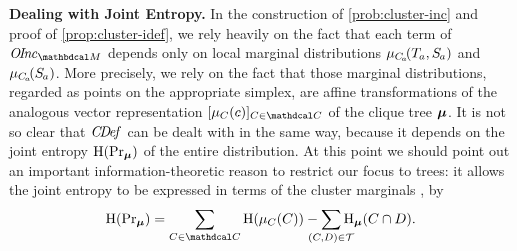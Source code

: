 \documentclass[twoside]{article}
\begin{document}
\textbf{Dealing with Joint Entropy.}
%
In the construction of \eqref{prob:cluster-inc}
and proof of \cref{prop:cluster-idef}, we rely
heavily on the fact that
each term of $\OInc_{\dg M}$
depends only on local marginal distributions $\mu_{C_{\mskip-2mu a}}\!(\Tgt a,  \Src a)$
and $\mu_{C_{\mskip-2mu a}}\!(\Src a)$.
More precisely, we rely on the fact that those marginal distributions, regarded as points on the appropriate simplex, are affine transformations of the analogous vector representation $[\mu_{C}(c) ]_{C \in \mathdcal C}$ of the clique tree $\boldsymbol\mu$.
It is not so clear that $\mathit{C\mskip-3.5muD\mskip-2.5mue\mskip-1.5muf}_{}$ can be dealt with in the same way, because it depends on the joint entropy $\operatorname{\mathrm{H}}(\Pr_{\boldsymbol\mu})$ of the entire distribution.
At this point we should point out an important information-theoretic reason to restrict our focus to trees:
it allows the joint entropy to be expressed
in terms of the cluster marginals \parencite{wainwright2008graphical},
by
\begin{equation}\label{eq:bethe-entropy}
    \H(\Pr\nolimits_{\bmu})
        = \sum_{C \in \mathdcal C} \H(\mu_C(C))
        - \sum_{\mathclap{(C,D) \in \mathcal T}} \H_{\bmu}(C \cap D).
\end{equation}
\end{document}
